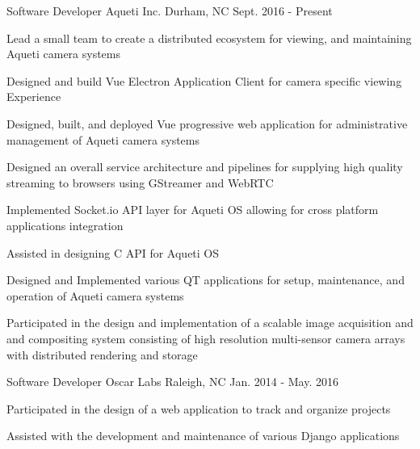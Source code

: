 

\begin{cventries}

  \cventry
    {Software Developer} %
    {Aqueti Inc.} %
    {Durham, NC} %
    {Sept. 2016 - Present} %
    {
      \begin{cvitems} %
        \item {Lead a small team to create a distributed ecosystem for viewing, and maintaining Aqueti camera systems}
        \item {Designed and build Vue Electron Application Client for camera specific viewing Experience}
        \item {Designed, built, and deployed Vue progressive web application for administrative management of Aqueti camera systems}
        \item {Designed an overall service architecture and pipelines for supplying high quality streaming to browsers using GStreamer and WebRTC}
        \item {Implemented Socket.io API layer for Aqueti OS allowing for cross platform applications integration}
        \item {Assisted in designing C API for Aqueti OS}
        \item {Designed and Implemented various QT applications for setup, maintenance, and operation of Aqueti camera systems}
        \item {Participated in the design and implementation of a scalable image acquisition and and compositing system consisting of high resolution multi-sensor camera arrays with distributed rendering and storage}
      \end{cvitems}
    }

  \cventry
    {Software Developer} %
    {Oscar Labs} %
    {Raleigh, NC} %
    {Jan. 2014 - May. 2016} %
    {
      \begin{cvitems} %
        \item {Participated in the design of a web application to track and organize projects}
        \item {Assisted with the development and maintenance of various Django applications}
      \end{cvitems}
    }

\end{cventries}
